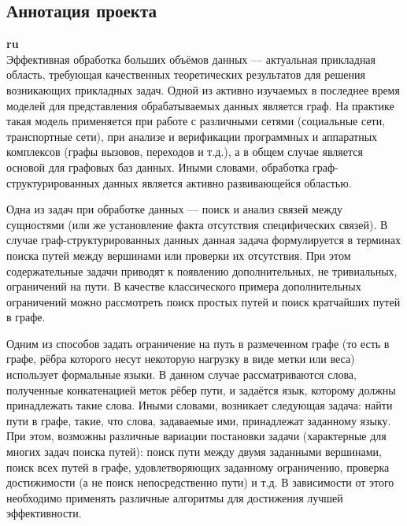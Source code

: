 \documentclass[12pt]{article}  %
\theoremstyle{remark}
\begin{document}
\subsection{Аннотация проекта}
\textbf{ru}\\
%
Эффективная обработка больших объёмов данных --- актуальная прикладная область, требующая качественных теоретических результатов для решения возникающих прикладных задач.
Одной из активно изучаемых в последнее время моделей для представления обрабатываемых данных является граф.
На практике такая модель применяется при работе с различными сетями (социальные сети, транспортные сети), при анализе и верификации программных и аппаратных комплексов (графы вызовов, переходов и т.д.), а в общем случае является основой для графовых баз данных.
Иными словами, обработка граф-структурированных данных является активно развивающейся областью.

Одна из задач при обработке данных --- поиск и анализ связей между сущностями (или же установление факта отсутствия специфических связей).
В случае граф-структурированных данных данная задача формулируется в терминах поиска путей между вершинами или проверки их отсутствия.
При этом содержательные задачи приводят к появлению дополнительных, не тривиальных, ограничений на пути.
В качестве классического примера дополнительных ограничений можно рассмотреть поиск простых путей и поиск кратчайших путей в графе.

Одним из способов задать ограничение на путь в размеченном графе (то есть в графе, рёбра которого несут некоторую нагрузку в виде метки или веса) использует формальные языки.
В данном случае рассматриваются слова, полученные конкатенацией меток рёбер пути, и задаётся язык, которому должны принадлежать такие слова.
Иными словами, возникает следующая задача: найти пути в графе, такие, что слова, задаваемые ими, принадлежат заданному языку.
При этом, возможны различные вариации постановки задачи (характерные для многих задач поиска путей): поиск пути между двумя заданными вершинами, поиск всех путей в графе, удовлетворяющих заданному ограничению, проверка достижимости (а не поиск непосредственно пути) и т.д.
В зависимости от этого необходимо применять различные алгоритмы для достижения лучшей эффективности.
\end{document}
